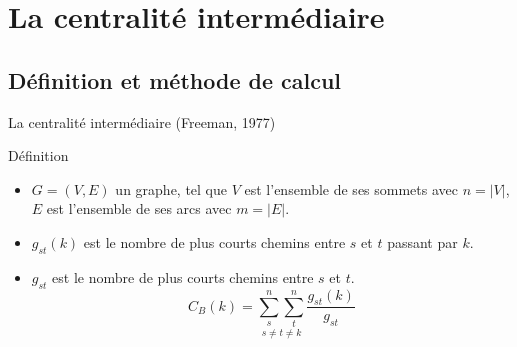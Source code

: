 \documentclass{beamer}
\begin{document}
\section{La centralité intermédiaire}


	\subsection{Définition et méthode de calcul}
	
\begin{frame}{La centralité intermédiaire (Freeman, 1977)}
	\begin{block}{Définition}
		\begin{itemize}
		    \item<1-> $G=(V, E)$ un graphe, tel que $V$ est l'ensemble de ses sommets avec $n=|V|$, $E$ est l'ensemble de ses arcs avec $m=|E|$. 
			\item<2-> $g_{st}(k)$ est le nombre de plus courts chemins entre $s$ et $t$ passant par $k$.
			\item<3-> $g_{st}$ est le nombre de plus courts chemins entre $s$ et $t$.
			$$
				C_{B}(k)=\underset{s\neq t\neq k}{\sum_s^{n}\sum_t^{n}}\frac{g_{st}(k)}{g_{st}}
			$$
		\end{itemize}
	\end{block}
\end{frame}
\end{document}

